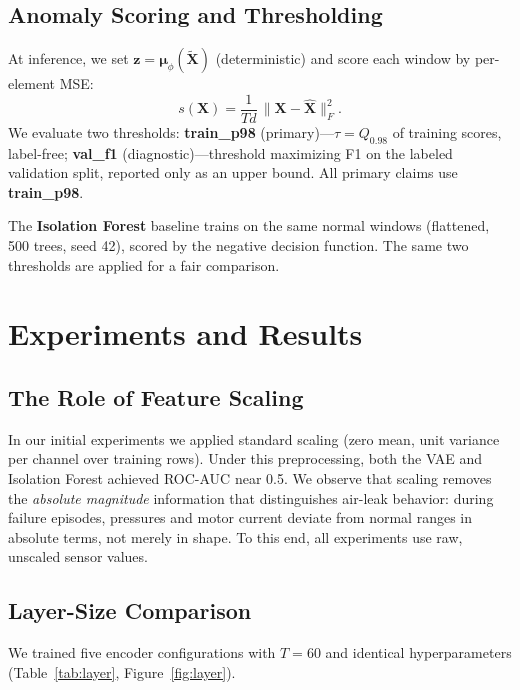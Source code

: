 \documentclass{article}
\begin{document}
\subsection{Anomaly Scoring and Thresholding}

At inference, we set $\mathbf{z} = \boldsymbol{\mu}_\phi(\tilde{\mathbf{X}})$
(deterministic) and score each window by per-element MSE:
\begin{equation}
  s(\mathbf{X})
  = \frac{1}{Td}\,\|\mathbf{X} - \hat{\mathbf{X}}\|_F^2.
\end{equation}
We evaluate two thresholds:
\textbf{train\_p98} (primary)---$\tau = Q_{0.98}$ of training scores, label-free;
\textbf{val\_f1} (diagnostic)---threshold maximizing F1 on the labeled validation
split, reported only as an upper bound.
All primary claims use \textbf{train\_p98}.

The \textbf{Isolation Forest} \citep{liu2008isolation} baseline trains on the same
normal windows (flattened, 500 trees, seed 42), scored by the negative decision
function.
The same two thresholds are applied for a fair comparison.


\section{Experiments and Results}

\subsection{The Role of Feature Scaling}

In our initial experiments we applied standard scaling (zero mean, unit variance per
channel over training rows).
Under this preprocessing, both the VAE and Isolation Forest achieved ROC-AUC near 0.5.
We observe that scaling removes the \emph{absolute magnitude} information that
distinguishes air-leak behavior: during failure episodes, pressures and motor current
deviate from normal ranges in absolute terms, not merely in shape.
To this end, all experiments use raw, unscaled sensor values.

\subsection{Layer-Size Comparison}

We trained five encoder configurations with $T = 60$ and identical hyperparameters
(Table~\ref{tab:layer}, Figure~\ref{fig:layer}).
\end{document}
